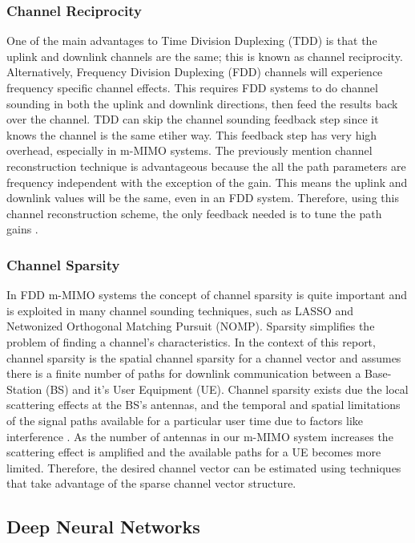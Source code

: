 \subsubsection{Channel Reciprocity}
One of the main advantages to Time Division Duplexing (TDD) is that the uplink and downlink channels are the same; this is known as channel reciprocity. Alternatively, Frequency Division Duplexing (FDD) channels will experience frequency specific channel effects. This requires FDD systems to do channel sounding in both the uplink and downlink directions, then feed the results back over the channel. TDD can skip the channel sounding feedback step since it knows the channel is the same etiher way. This feedback step has very high overhead, especially in m-MIMO systems. The previously mention channel reconstruction technique is advantageous because the all the path parameters are frequency independent with the exception of the gain. This means the uplink and downlink values will be the same, even in an FDD system. Therefore, using this channel reconstruction scheme, the only feedback needed is to tune the path gains \cite{Han2019}. 

\subsubsection{Channel Sparsity}
In FDD m-MIMO systems the concept of channel sparsity is quite important and is exploited in many channel sounding techniques, such as LASSO and Netwonized Orthogonal Matching Pursuit (NOMP). Sparsity simplifies the problem of finding a channel's characteristics. In the context of this report, channel sparsity is the spatial channel sparsity for a channel vector and assumes there is a finite number of paths for downlink communication between a Base-Station (BS) and it's User Equipment (UE). Channel sparsity exists due the local scattering effects at the BS's antennas, and the temporal and spatial limitations of the signal paths available for a particular user time due to factors like interference \cite{Liu2016}. As the number of antennas in our m-MIMO system increases the scattering effect is amplified and the available paths for a UE becomes more limited. Therefore, the desired channel vector can be estimated using techniques that take advantage of the sparse channel vector structure.

\subsection{Deep Neural Networks}

